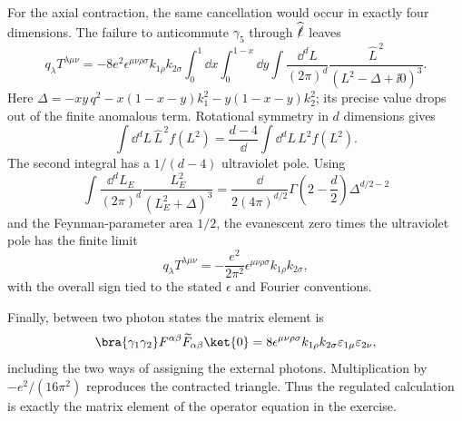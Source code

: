 \begin{enumerate}
  For the axial contraction, the same cancellation would occur in exactly
  four dimensions.  The failure to anticommute \(\gamma_5\) through
  \(\widehat{\slashed\ell}\) leaves
  \[
    q_\lambda T^{\lambda\mu\nu}
      =-8e^2\epsilon^{\mu\nu\rho\sigma}k_{1\rho}k_{2\sigma}
       \int_0^1\dd x\int_0^{1-x}\dd y
       \int\frac{\dd^dL}{(2\pi)^d}
       \frac{\widehat L^{\,2}}{(L^2-\Delta+\ii0)^3}.
  \]
  Here
  \(\Delta=-xy\,q^2-x(1-x-y)k_1^2
  -y(1-x-y)k_2^2\); its precise value drops out of the finite anomalous
  term.  Rotational symmetry in \(d\) dimensions gives
  \[
    \int \dd^dL\,\widehat L^{\,2}f(L^2)
      =\frac{d-4}{\dd}\int \dd^dL\,L^2f(L^2).
  \]
  The second integral has a \(1/(d-4)\) ultraviolet pole.  Using
  \[
    \int\frac{\dd^dL_E}{(2\pi)^d}
      \frac{L_E^2}{(L_E^2+\Delta)^3}
      =\frac{\dd}{2(4\pi)^{d/2}}
        \Gamma\!\left(2-\frac d2\right)\Delta^{d/2-2}
  \]
  and the Feynman-parameter area \(1/2\), the evanescent zero times the
  ultraviolet pole has the finite limit
  \[
    \boxed{q_\lambda T^{\lambda\mu\nu}
      =-\frac{e^2}{2\pi^2}
       \epsilon^{\mu\nu\rho\sigma}k_{1\rho}k_{2\sigma},}
  \]
  with the overall sign tied to the stated \(\epsilon\) and Fourier
  conventions.

  Finally, between two photon states the matrix element is
  \[
    \bra{\gamma_1\gamma_2}
      F^{\alpha\beta}\widetilde F_{\alpha\beta}\ket{0}
    =8\epsilon^{\mu\nu\rho\sigma}k_{1\rho}k_{2\sigma}
      \varepsilon_{1\mu}\varepsilon_{2\nu},
  \]
  including the two ways of assigning the external photons.
  Multiplication by \(-e^2/(16\pi^2)\) reproduces the contracted
  triangle.  Thus the regulated calculation is exactly the matrix
  element of the operator equation in the exercise.


\end{enumerate}
